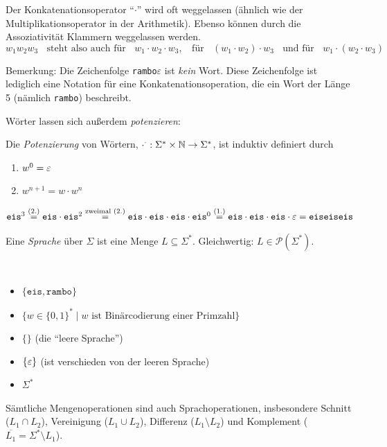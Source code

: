 Der Konkatenationsoperator "`$\cdot$"' wird oft weggelassen (ähnlich wie der Multiplikationsoperator in der Arithmetik).
Ebenso können durch die Assoziativität Klammern weggelassen werden.
\begin{displaymath}
  w_1w_2w_3 \;\; \text{ steht also auch für } \;\; w_1\cdot w_2\cdot w_3,\;\;\text{ für }\;\;  (w_1 \cdot w_2) \cdot w_3 \;\;\text{ und für }\;\; w_1 \cdot (w_2 \cdot w_3)
\end{displaymath}

Bemerkung: Die Zeichenfolge \texttt{rambo}$\varepsilon$ ist \emph{kein} Wort.
Diese Zeichenfolge ist lediglich eine Notation für eine Konkatenationsoperation, die ein Wort der Länge 5 (nämlich \texttt{rambo}) beschreibt.

Wörter lassen sich außerdem \emph{potenzieren}:
\begin{Def}
  Die \emph{Potenzierung} von Wörtern, $\cdot ^ \cdot: \Sigma^*\times \mathbb{N} \to \Sigma^*$, ist induktiv definiert durch
  \begin{enumerate}
  \item $w^0 = \varepsilon$ 
  \item $w^{n+1} = w \cdot w^n$
  \qedhere
  \end{enumerate}
\end{Def}
\begin{Bsp*} $\mathtt{eis}^3 
\stackrel{(2.)}{=} \mathtt{eis}\cdot\mathtt{eis}^2 
\stackrel{\text{zweimal } (2.)}{=} \mathtt{eis}\cdot\mathtt{eis}\cdot\mathtt{eis}\cdot\mathtt{eis}^0
\stackrel{(1.)}{=} \mathtt{eis}\cdot\mathtt{eis}\cdot\mathtt{eis}\cdot\varepsilon
= \mathtt{eiseiseis}
$
\end{Bsp*}

\begin{Def}[name={[Sprache über $\Sigma$]}]
	Eine \emph{Sprache} über $\Sigma$ ist eine Menge
        $L\subseteq\Sigma^*$. Gleichwertig: $L \in \mathcal{P}(\Sigma^*)$.
\end{Def}

\goodbreak

\begin{Bsp*}~ 
  \begin{itemize}
  \item 
	$\{\mathtt{eis}, \mathtt{rambo}\}$
  \item
    $\{w\in\{0,1\}^*\mid w \text{ ist Binärcodierung einer Primzahl}\}$
  \item $\{\}$ (die "`leere Sprache"')
  \item $\{ \varepsilon \}$ (ist verschieden von der leeren Sprache)
  \item $\Sigma^*$
  \qedhere
  \end{itemize}
\end{Bsp*}
Sämtliche Mengenoperationen sind auch Sprachoperationen, insbesondere Schnitt ($L_1 \cap L_2$), Vereinigung ($L_1 \cup L_2$), Differenz ($L_1 \setminus L_2$) und Komplement ($\overline{L_1} = \Sigma^* \setminus L_1$).

